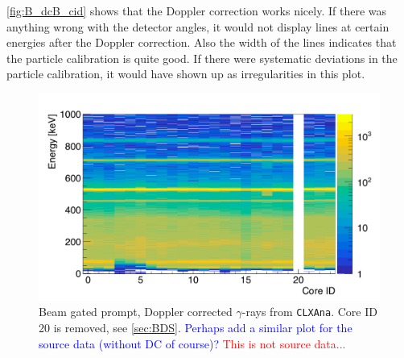 \documentclass[twoside,english]{uiofysmaster/uiofysmaster}
\newcommand{\ga}{$\gamma$}
\let\orgautoref\autoref
\renewcommand{\autoref}
        {%
		 \def\sectionautorefname{Section}%
		 \def\subsectionautorefname{Section}%
		 \def\subsubsectionautorefname{Section}%
		 \def\chapterautorefname{Chapter}%
          \orgautoref}
\begin{document}
\autoref{fig:B_dcB_cid} shows that the Doppler correction works nicely.
If there was anything wrong with the detector angles, it would not display lines at certain energies after the Doppler correction. 
Also the width of the lines indicates that the particle calibration is quite good. 
If there were systematic deviations in the particle calibration, it would have shown up as irregularities in this plot.

\begin{figure}[ht]
	\centering
	\includegraphics[width=\textwidth]{../Plots/plotting/B_dcB_cid.png}
	\caption{Beam gated prompt, Doppler corrected \ga-rays from \texttt{CLXAna}. Core ID 20 is removed, see \autoref{sec:BDS}. \textcolor{blue}{Perhaps add a similar plot for the source data (without DC of course)?} \textcolor{red}{This is not source data...}}
	\label{fig:B_dcB_cid}
\end{figure}


%	

\end{document}
